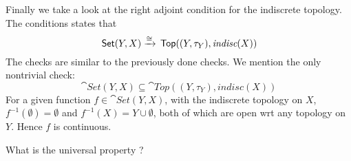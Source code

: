 \begin{frame}
    Finally we take a look at the right adjoint condition for the indiscrete
    topology. The conditions states that 
    \begin{equation}
         \,\textsf{Set}(Y,X ) \xrightarrow{\cong} \,\textsf{Top}((Y, \tau_Y) ,\textit{indisc}(X))
    \end{equation}
    The checks are similar to the previously done checks.  We mention the only
    nontrivial check: 
    \begin{equation}
        \cat{Set}(Y,X ) \subseteq\cat{Top}((Y, \tau_Y) ,\textit{indisc}(X))
    \end{equation}
    For a given function \(f \in   \cat{Set}(Y,X )\), with the indiscrete
    topology on \(X\), \(f^{-1}(\emptyset) = \emptyset\) and \(f^{-1}(X) = Y
    \cup \emptyset\), both of which are open wrt any topology on \(Y\). Hence
    \(f\) is continuous. 

    What is the universal property ? 

\end{frame}
